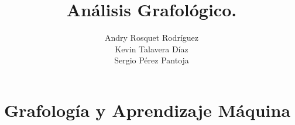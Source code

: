 \documentclass[10pt, a4paper]{article}
\begin{document}
    \title{An\'alisis Grafol\'ogico.}
    \author{Andry Rosquet Rodr\'iguez \\ Kevin Talavera D\'iaz\\ Sergio P\'erez Pantoja}
    \date{}
    \maketitle

    \begin{abstract}

    \end{abstract}
    
    \section{}
    


    
    \section{Grafolog\'ia y Aprendizaje M\'aquina}


\begin{thebibliography}{99}
    \end{thebibliography}
\end{document}
